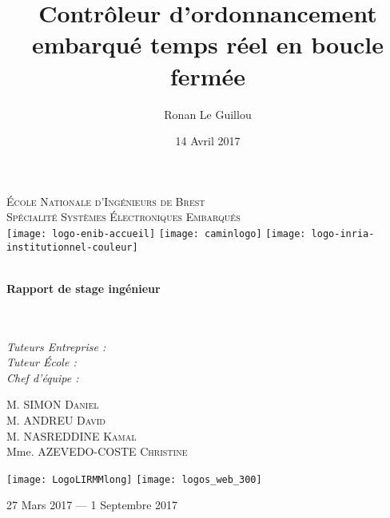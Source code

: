 \documentclass[10pt,a4paper]{report}
\author{Ronan Le Guillou}
\date{14 Avril 2017}
\title{Contrôleur d'ordonnancement embarqué temps réel en boucle fermée}
\begin{document}
\renewcommand{\contentsname}{Sommaire}

\makeatletter 
	\begin{titlepage} 
	\centering 
		{\large \textsc{École Nationale d'Ingénieurs de Brest}}\\ 
		\textsc{Spécialité Systèmes Électroniques Embarqués}\\ 
		
		\vspace{1cm}
		\texttt{[image: logo-enib-accueil]}
		\hfill 
		\texttt{[image: caminlogo]}
		\hfill 
		\texttt{[image: logo-inria-institutionnel-couleur]}
		\vspace{1cm}
		
		{\large\textbf{	\@date\\ Rapport de stage ingénieur}}\\ 
		\vfill 
		{\LARGE \textbf{\@title}} \\ 
		\vspace{2.5em} 
        \textsc{\@author}\\
		\vfill 
		
	\begin{minipage}{0.35\textwidth}
      \begin{flushleft} \large
      \emph{Tuteurs Entreprise :}\\ 
		\vspace{1.3em}       
      \emph{Tuteur École :}\\
      \emph{Chef d'équipe :}
      \end{flushleft}
    \end{minipage}
    \hfill 
    \begin{minipage}{0.6\textwidth}
      \begin{flushright} \large
         M. SIMON \textsc{Daniel}\\
         M. ANDREU \textsc{David}\\
         M. NASREDDINE \textsc{Kamal}\\
         Mme. AZEVEDO-COSTE \textsc{Christine}
      \end{flushright}
    \end{minipage}
		
		\vfill 
		
		\texttt{[image: LogoLIRMMlong]} 
		\hfill 
		\texttt{[image: logos\_web\_300]} 
		
	\vspace{1em}   
    {\large  27 Mars 2017 — 1\ier{} Septembre 2017}
	\end{titlepage} 
	\makeatother
	\tableofcontents
	
	
\end{document}
